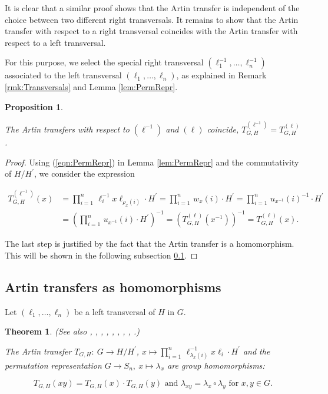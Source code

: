 \documentclass{amsart}
\newtheorem{theorem}{Theorem}[section]
\newtheorem{proposition}{Proposition}[section]
\theoremstyle{definition}
\numberwithin{equation}{section}
\begin{document}
It is clear that a similar proof shows that the Artin transfer is independent of
the choice between two different right transversals. 
It remains to show that the Artin transfer with respect to a right transversal
coincides with the Artin transfer with respect to a left transversal.


For this purpose,
we select the special right transversal \((\ell_1^{-1},\ldots,\ell_n^{-1})\)
associated to the left transversal \((\ell_1,\ldots,\ell_n)\),
as explained in Remark
\ref{rmk:Transversals}
and Lemma
\ref{lem:PermRepr}.

\begin{proposition}
\label{prp:RightLeft}

The Artin transfers with respect to \((\ell^{-1})\) and \((\ell)\) coincide,  \(T_{G,H}^{(\ell^{-1})}=T_{G,H}^{(\ell)}\).

\end{proposition}


\begin{proof}
Using
(\ref{eqn:PermRepr})
in Lemma
\ref{lem:PermRepr}
and the commutativity of \(H/H^\prime\), we consider the expression

\begin{align*}
T_{G,H}^{(\ell^{-1})}(x) &= \prod_{i=1}^n\,\ell_i^{-1}x\ell_{\rho_x(i)}\cdot H^\prime
=\prod_{i=1}^n\,w_x(i)\cdot H^\prime=\prod_{i=1}^n\,u_{x^{-1}}(i)^{-1}\cdot H^\prime \\
                      &= (\prod_{i=1}^n\,u_{x^{-1}}(i)\cdot H^\prime)^{-1}
=(T_{G,H}^{(\ell)}(x^{-1}))^{-1}=T_{G,H}^{(\ell)}(x).
\end{align*}

\noindent
The last step is justified by the fact that the Artin transfer is a homomorphism.
This will be shown in the following subsection
\ref{ss:Hom}.
\end{proof}



\subsection{Artin transfers as homomorphisms}
\label{ss:Hom}

Let \((\ell_1,\ldots,\ell_n)\) be a left transversal of \(H\) in \(G\).

\begin{theorem}
\label{thm:Hom}
(See also
\cite[(2), p.1014]{Su},
\cite[Thm.14.2.1, p.202]{Hl},
\cite[Hauptsatz 1.4, p.413]{Hp},
\cite[Thm.3.2, p.246]{Gs},
\cite[(37.2), p.198]{Ab},
\cite[Thm.(17.2), p.61]{DkHw},
\cite[p.155]{SmTb},
\cite[Thm.5.2, p.150]{Is},
\cite[Prop.1, p.2]{Ol}.)

The Artin transfer \(T_{G,H}:\ G\to H/H^\prime\),
\(x\mapsto\prod_{i=1}^n\,\ell_{\lambda_x(i)}^{-1}x\ell_i\cdot H^\prime\)
and the permutation representation \(G\to S_n,\ x\mapsto\lambda_x\) are group homomorphisms:

\begin{equation}
\label{eqn:Hom}
T_{G,H}(xy)=T_{G,H}(x)\cdot T_{G,H}(y) \text{ and } \lambda_{xy}=\lambda_x\circ\lambda_y
\text{ for } x,y\in G.
\end{equation}

\end{theorem}
\end{document}
